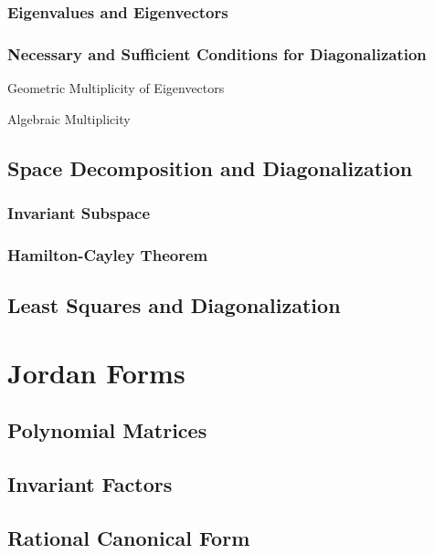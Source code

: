 \documentclass[11pt]{../../TexTemplate/elegantbook} %
\begin{document}
\subsection{Eigenvalues and Eigenvectors}

\subsection{Necessary and Sufficient Conditions for Diagonalization}
\begin{leftbarTitle}{Geometric Multiplicity of Eigenvectors}\end{leftbarTitle}
\begin{leftbarTitle}{Algebraic Multiplicity}\end{leftbarTitle}


\section{Space Decomposition and Diagonalization}

\subsection{Invariant Subspace}

\subsection{Hamilton-Cayley Theorem}

\section{Least Squares and Diagonalization}

\chapter{Jordan Forms}
\section{Polynomial Matrices}

\section{Invariant Factors}

\section{Rational Canonical Form}
\end{document}
